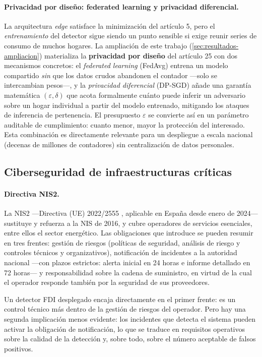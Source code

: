 \paragraph{Privacidad por diseño: federated learning y privacidad diferencial.} La arquitectura \textit{edge} satisface la minimización del artículo 5, pero el \emph{entrenamiento} del detector sigue siendo un punto sensible si exige reunir series de consumo de muchos hogares. La ampliación de este trabajo (\cref{sec:resultados-ampliacion}) materializa la \textbf{privacidad por diseño} del artículo 25 con dos mecanismos concretos: el \emph{federated learning} (FedAvg) entrena un modelo compartido \emph{sin} que los datos crudos abandonen el contador ---solo se intercambian pesos---, y la \emph{privacidad diferencial} (DP-SGD) añade una garantía matemática $(\varepsilon,\delta)$ que acota formalmente cuánto puede inferir un adversario sobre un hogar individual a partir del modelo entrenado, mitigando los ataques de inferencia de pertenencia. El presupuesto $\varepsilon$ se convierte así en un parámetro auditable de cumplimiento: cuanto menor, mayor la protección del interesado. Esta combinación es directamente relevante para un despliegue a escala nacional (decenas de millones de contadores) sin centralización de datos personales.

\subsection{Ciberseguridad de infraestructuras críticas}

\paragraph{Directiva NIS2.} La NIS2 ---Directiva (UE) 2022/2555 \cite{nis2directive}, aplicable en España desde enero de 2024--- sustituye y refuerza a la NIS de 2016, y cubre operadores de servicios esenciales, entre ellos el sector energético. Las obligaciones que introduce se pueden resumir en tres frentes: gestión de riesgos (políticas de seguridad, análisis de riesgo y controles técnicos y organizativos), notificación de incidentes a la autoridad nacional ---con plazos estrictos: alerta inicial en 24 horas e informe detallado en 72 horas--- y responsabilidad sobre la cadena de suministro, en virtud de la cual el operador responde también por la seguridad de sus proveedores.

Un detector FDI desplegado encaja directamente en el primer frente: es un control técnico más dentro de la gestión de riesgos del operador. Pero hay una segunda implicación menos evidente: los incidentes que detecta el sistema pueden activar la obligación de notificación, lo que se traduce en requisitos operativos sobre la calidad de la detección y, sobre todo, sobre el número aceptable de falsos positivos.

